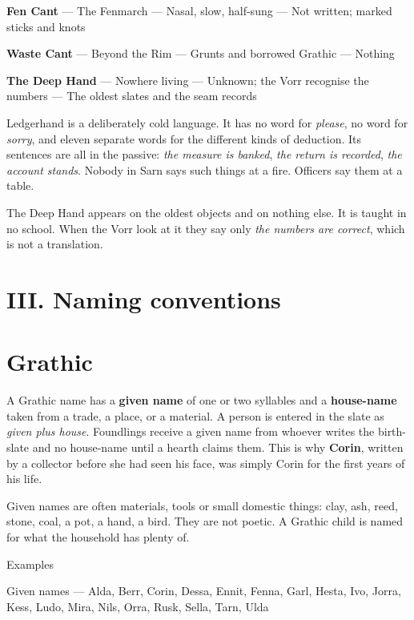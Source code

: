 \documentclass{design/chronicle}
\begin{document}
\textbf{Fen Cant} — The Fenmarch — Nasal, slow, half-sung — Not written; marked sticks and knots\par

\textbf{Waste Cant} — Beyond the Rim — Grunts and borrowed Grathic — Nothing\par

\textbf{The Deep Hand} — Nowhere living — Unknown; the Vorr recognise the numbers — The oldest slates and the seam records\par

Ledgerhand is a deliberately cold language. It has no word for \emph{please}, no word for \emph{sorry}, and eleven separate words for the different kinds of deduction. Its sentences are all in the passive: \emph{the measure is banked}, \emph{the return is recorded}, \emph{the account stands}. Nobody in Sarn says such things at a fire. Officers say them at a table.

The Deep Hand appears on the oldest objects and on nothing else. It is taught in no school. When the Vorr look at it they say only \emph{the numbers are correct}, which is not a translation.

\CRrule

\section*{III. Naming conventions}

\section*{Grathic}

A Grathic name has a \textbf{given name} of one or two syllables and a \textbf{house-name} taken from a trade, a place, or a material. A person is entered in the slate as \emph{given plus house}. Foundlings receive a given name from whoever writes the birth-slate and no house-name until a hearth claims them. This is why \textbf{Corin}, written by a collector before she had seen his face, was simply Corin for the first years of his life.

Given names are often materials, tools or small domestic things: clay, ash, reed, stone, coal, a pot, a hand, a bird. They are not poetic. A Grathic child is named for what the household has plenty of.

Examples\par

Given names — Alda, Berr, Corin, Dessa, Ennit, Fenna, Garl, Hesta, Ivo, Jorra, Kess, Ludo, Mira, Nils, Orra, Rusk, Sella, Tarn, Ulda\par
\end{document}
